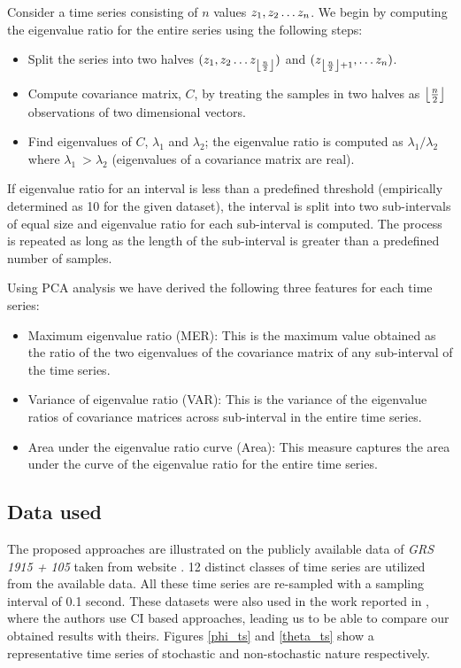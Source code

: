 \documentclass[10pt,conference]{IEEEtran}
\DeclarePairedDelimiter\floor{\lfloor}{\rfloor}
\begin{document}
Consider a time series consisting of $n$ values  $z_1, z_2 \mathellipsis z_n$. We begin by computing the eigenvalue ratio for the entire series using the following steps:
\begin{itemize}
\item  Split the series into two halves $(z_1, z_2 \mathellipsis z_{\floor*{\frac{n}{2}}})$ and $(z_{\floor*{\frac{n}{2}} + 1}, \mathellipsis z_n)$.
\item Compute covariance matrix, $C$,  by treating the samples in two halves as $\floor*{\frac{n}{2}}$ observations of two dimensional vectors.
\item Find eigenvalues of $C$, $\lambda_1$ and $\lambda_2$; the eigenvalue ratio is computed as  $\lambda_1/\lambda_2$ where $\lambda_1 \ > \lambda_2$ (eigenvalues of a covariance matrix are real).
\end{itemize}
If eigenvalue ratio for an interval is less than a predefined threshold (empirically determined as 10 for the given dataset), the interval is split into two sub-intervals of equal size and eigenvalue ratio for each sub-interval is computed. The process is repeated as long as the length of the sub-interval is greater than a predefined number of samples.

Using PCA analysis we have derived the following three features for each time series:
\begin{itemize}
\item Maximum eigenvalue ratio (MER): This is the maximum value obtained as the ratio of the two eigenvalues of the covariance matrix of any sub-interval of the time series.
\item Variance of eigenvalue ratio (VAR): This is the variance of the eigenvalue ratios of covariance matrices across sub-interval in the entire time series.
\item Area under the eigenvalue ratio curve (Area): This measure captures the area under the curve of the eigenvalue ratio for the entire time series.
\end{itemize}

\subsection{Data used}
The proposed approaches are illustrated on the publicly available data of \textit{GRS 1915 + 105} taken from website \cite{xte}. 12 distinct classes of time series are utilized from the available data. All these time series are re-sampled with a sampling interval of 0.1 second. These datasets  were  also used in the work reported in \cite{Adegoke2018}, where the authors use CI based approaches, leading us to be able to compare our obtained results with theirs. Figures \ref{phi_ts} and \ref{theta_ts} show a representative time series of stochastic and non-stochastic  nature respectively.
\end{document}
